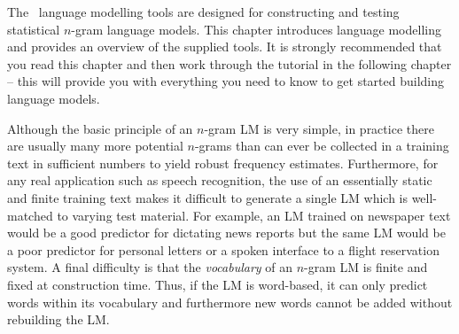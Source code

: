 %
%
%


The \HTK\ language modelling tools are designed for constructing and
testing statistical $n$-gram language models.  This chapter introduces
language modelling and provides an overview of the supplied tools.  It
is strongly recommended that you read this chapter and then work
through the tutorial in the following chapter -- this will provide you
with everything you need to know to get started building language models.


Although the basic principle of an $n$-gram LM is very simple, in
practice there are usually many more potential $n$-grams than can ever
be collected in a training text in sufficient numbers to yield robust
frequency estimates.  Furthermore, for any real application such as
speech recognition, the use of an essentially static and finite
training text makes it difficult to generate a single LM which is
well-matched to varying test material. For example, an LM trained on
newspaper text would be a good predictor for dictating news
reports but the same LM would be a poor predictor for personal letters
or a spoken interface to a flight reservation system.  A final
difficulty is that the \textit{vocabulary} of an $n$-gram LM is finite
and fixed at construction time.  Thus, if the LM is word-based, it can
only predict words within its vocabulary and furthermore new words
cannot be added without rebuilding the LM.

